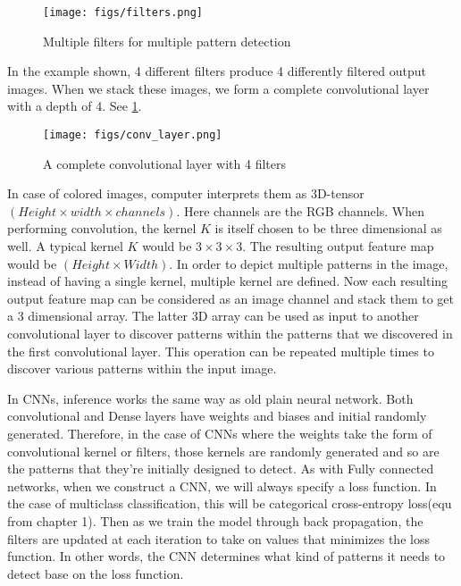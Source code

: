 \begin{figure}[!htbp]
  \centering
  \texttt{[image: figs/filters.png]}
  \caption{Multiple filters for multiple pattern detection}
\end{figure}

In the example shown, 4 different filters produce 4 differently filtered output images.
When we stack these images, we form a complete convolutional layer with a depth of 4. See \cref{fig:conv_layer}.

\begin{figure}[!htbp]
  \centering
  \texttt{[image: figs/conv\_layer.png]}
  \caption{A complete convolutional layer with 4 filters}\label{fig:conv_layer}
\end{figure}

In case of colored images, computer interprets them as 3D-tensor $(Height \times width \times channels)$. Here channels are the RGB channels. When
performing convolution, the kernel $K$ is itself chosen to be three dimensional as well. A typical kernel $K$ would be $3 \times 3 \times 3$. The
resulting output feature map would be $(Height \times Width)$. In order to depict multiple patterns in the image, instead of having a single kernel,
multiple kernel are defined. Now each resulting output feature map can be considered as an image channel and stack them to get a 3 dimensional
array. The latter 3D array can be used as input to another convolutional layer to discover patterns within the patterns that we discovered in the
first convolutional layer. This operation can be repeated multiple times to discover various patterns within the input image.

In CNNs, inference works the same way as old plain neural network. Both convolutional and Dense layers have weights and biases and initial
randomly generated. Therefore, in the case of CNNs where the weights take the form of convolutional kernel or filters, those kernels are randomly
generated and so are the patterns that they're initially designed to detect. As with Fully connected networks, when we construct a CNN, we will
always specify a loss function. In the case of multiclass classification, this will be categorical cross-entropy loss(equ  from chapter 1). Then as
we train the model through back propagation, the filters are updated at each iteration to take on values that minimizes the loss function. In other
words, the CNN determines what kind of patterns it needs to detect base on the loss function.

